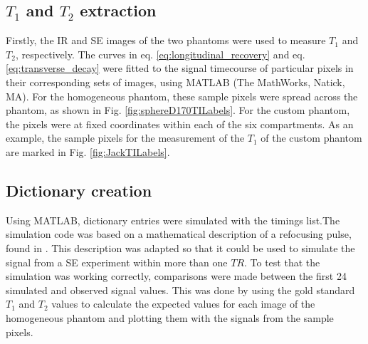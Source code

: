 \documentclass[journal]{IEEEtran}
\begin{document}
\subsection{$T_1$ and $T_2$ extraction}
Firstly, the IR and SE images of the two phantoms were used to measure $T_1$ and $T_2$, respectively. The curves in eq. \eqref{eq:longitudinal_recovery} and eq. \eqref{eq:transverse_decay} were fitted to the signal timecourse of particular pixels in their corresponding sets of images, using  MATLAB (The
MathWorks, Natick, MA). For the homogeneous phantom, these sample pixels were spread across the phantom, as shown in Fig. \ref{fig:sphereD170TILabels}. For the custom phantom, the pixels were at fixed coordinates within each of the six compartments. As an example, the sample pixels for the measurement of the $T_1$ of the custom phantom are marked in Fig. \ref{fig:JackTILabels}. 

\subsection{Dictionary creation}


Using MATLAB, dictionary entries were simulated with the timings list.The simulation code was based on a mathematical description of a refocusing pulse, found in \cite{bernstein2004handbook}. This description was adapted so that it could be used to simulate the signal from a SE experiment within more than one $TR$.
To test that the simulation was working correctly, comparisons were made between the first 24 simulated and observed signal values. This was done by using the gold standard $T_1$ and $T_2$ values to calculate the expected values for each image of the homogeneous phantom and plotting them with the signals from the sample pixels.
\end{document}
